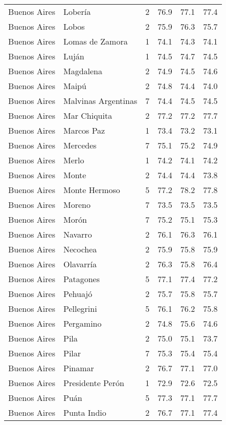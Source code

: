 \documentclass[12pt,spanish,]{article}
\begin{document}
\begin{landscape}
\begin{longtable}[t]{llrrrr}
Buenos Aires & Lobería & 2 & 76.9 & 77.1 & 77.4\\
Buenos Aires & Lobos & 2 & 75.9 & 76.3 & 75.7\\
Buenos Aires & Lomas de Zamora & 1 & 74.1 & 74.3 & 74.1\\
\addlinespace
Buenos Aires & Luján & 1 & 74.5 & 74.7 & 74.5\\
Buenos Aires & Magdalena & 2 & 74.9 & 74.5 & 74.6\\
Buenos Aires & Maipú & 2 & 74.8 & 74.4 & 74.0\\
Buenos Aires & Malvinas Argentinas & 7 & 74.4 & 74.5 & 74.5\\
Buenos Aires & Mar Chiquita & 2 & 77.2 & 77.2 & 77.7\\
\addlinespace
Buenos Aires & Marcos Paz & 1 & 73.4 & 73.2 & 73.1\\
Buenos Aires & Mercedes & 7 & 75.1 & 75.2 & 74.9\\
Buenos Aires & Merlo & 1 & 74.2 & 74.1 & 74.2\\
Buenos Aires & Monte & 2 & 74.4 & 74.4 & 73.8\\
Buenos Aires & Monte Hermoso & 5 & 77.2 & 78.2 & 77.8\\
\addlinespace
Buenos Aires & Moreno & 7 & 73.5 & 73.5 & 73.5\\
Buenos Aires & Morón & 7 & 75.2 & 75.1 & 75.3\\
Buenos Aires & Navarro & 2 & 76.1 & 76.3 & 76.1\\
Buenos Aires & Necochea & 2 & 75.9 & 75.8 & 75.9\\
Buenos Aires & Olavarría & 2 & 76.3 & 75.8 & 76.4\\
\addlinespace
Buenos Aires & Patagones & 5 & 77.1 & 77.4 & 77.2\\
Buenos Aires & Pehuajó & 2 & 75.7 & 75.8 & 75.7\\
Buenos Aires & Pellegrini & 5 & 76.1 & 76.2 & 75.8\\
Buenos Aires & Pergamino & 2 & 74.8 & 75.6 & 74.6\\
Buenos Aires & Pila & 2 & 75.0 & 75.1 & 73.7\\
\addlinespace
Buenos Aires & Pilar & 7 & 75.3 & 75.4 & 75.4\\
Buenos Aires & Pinamar & 2 & 76.7 & 77.1 & 77.0\\
Buenos Aires & Presidente Perón & 1 & 72.9 & 72.6 & 72.5\\
Buenos Aires & Puán & 5 & 77.3 & 77.1 & 77.7\\
Buenos Aires & Punta Indio & 2 & 76.7 & 77.1 & 77.4\\

\end{longtable}
\end{landscape}
\end{document}
